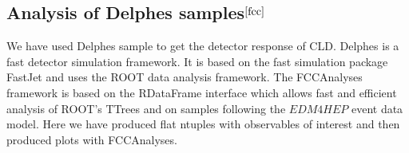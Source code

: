 \subsection{Analysis of Delphes samples$^{\cite{fcc}}$}
We have used Delphes sample  to get the detector response of CLD. Delphes is a fast detector 
simulation framework. It is based on the fast simulation package FastJet and uses the ROOT data 
analysis framework.
The FCCAnalyses framework is based on the RDataFrame interface which allows fast and efficient 
analysis of ROOT's TTrees and on samples following the $EDM4HEP$ event data model.
Here we have produced   flat ntuples with observables of interest and then 
produced plots with FCCAnalyses.

